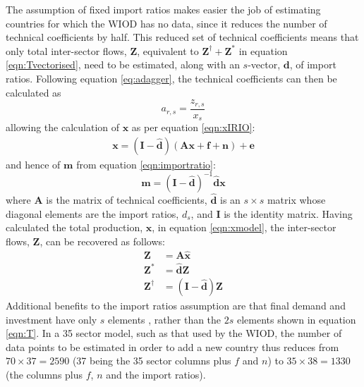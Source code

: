 \documentclass[a4paper]{article}
\begin{document}
The assumption of fixed import ratios makes easier the job of estimating countries for which the WIOD has no data, since it reduces the number of technical coefficients by half.
This reduced set of technical coefficients means that only total inter-sector flows, $\boldsymbol{Z}$, equivalent to $\boldsymbol{Z}^{\dagger} + \boldsymbol{Z}^{*}$ in equation \eqref{eqn:Tvectorised}, need to be estimated, along with an $s$-vector, $\boldsymbol{d}$, of import ratios. 
Following equation \eqref{eq:adagger}, the technical coefficients can then be calculated as
\begin{equation}
a_{r,s} = \frac{z_{r,s}}{x_s}
\end{equation}
allowing the calculation of $\boldsymbol{x}$ as per equation \eqref{eqn:xIRIO}:
\begin{align}
\boldsymbol{x} 
= 
(\boldsymbol{I} - \boldsymbol{\hat{d}})
(
\boldsymbol{Ax} + 
\boldsymbol{f} + \boldsymbol{n}
)
+ \boldsymbol{e}
\label{eqn:xmodel}
\end{align}
and hence of $\boldsymbol{m}$ from equation \eqref{eqn:importratio}:
\begin{equation}
\boldsymbol{m} = 
(\boldsymbol{I} - 
\boldsymbol{\hat{d}})^{-1} 
\boldsymbol{\hat{d}}\boldsymbol{x}\label{eqn:mmodel}
\end{equation}
where $\boldsymbol{A}$ is the matrix of technical coefficients, $\boldsymbol{\hat{d}}$ is an $s \times s$ matrix whose diagonal elements are the import ratios, $d_s$, and $\boldsymbol{I}$ is the identity matrix.
Having calculated the total production, $\boldsymbol{x}$, in equation \eqref{eqn:xmodel}, the inter-sector flows, $\boldsymbol{Z}$, can be recovered as follows:
\begin{align}
\boldsymbol{Z}& = \boldsymbol{A}\boldsymbol{\hat{x}}\nonumber\\
\boldsymbol{Z^*}& = \boldsymbol{\hat{d}}\boldsymbol{Z}\\
\boldsymbol{Z^\dagger}& = (\boldsymbol{I} - \boldsymbol{\hat{d}})
	\boldsymbol{Z}\label{eqn:zstar}
\end{align}
Additional benefits to the import ratios assumption are that final demand and investment have only $s$ elements , rather than the $2s$ elements shown in equation \eqref{eqn:T}.
In a 35 sector model, such as that used by the WIOD, the number of data points to be estimated in order to add a new country thus reduces from $70 \times 37 = 2590$ (37 being the 35 sector columns plus $f$ and $n$) to $35 \times 38 = 1330$ (the columns plus $f$, $n$ and the import ratios).
\end{document}

